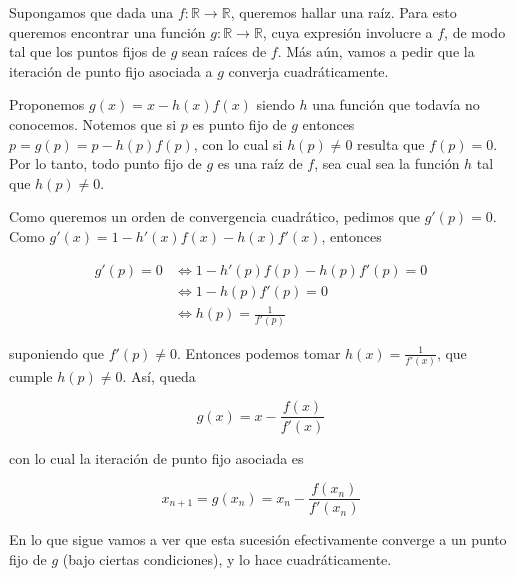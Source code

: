 Supongamos que dada una $f: \mathbb{R} \to \mathbb{R}$, queremos hallar una raíz. Para esto queremos encontrar una función $g: \mathbb{R} \to \mathbb{R}$, cuya expresión involucre a $f$, de modo tal que los puntos fijos de $g$ sean raíces de $f$. Más aún, vamos a pedir que la iteración de punto fijo asociada a $g$ converja cuadráticamente.

Proponemos $g(x) = x - h(x)f(x)$ siendo $h$ una función que todavía no conocemos. Notemos que si $p$ es punto fijo de $g$ entonces $p = g(p) = p - h(p)f(p)$, con lo cual si $h(p) \neq 0$ resulta que $f(p) = 0$. Por lo tanto, todo punto fijo de $g$ es una raíz de $f$, sea cual sea la función $h$ tal que $h(p) \neq 0$.

Como queremos un orden de convergencia cuadrático, pedimos que $g'(p) = 0$. Como $g'(x) = 1 - h'(x)f(x) - h(x) f'(x)$, entonces

\begin{align*}
g'(p) = 0 &\Leftrightarrow 1 - h'(p)f(p) - h(p)f'(p) = 0\\
&\Leftrightarrow 1 - h(p)f'(p) = 0\\
&\Leftrightarrow h(p) = \frac{1}{f'(p)}
\end{align*}

suponiendo que $f'(p) \neq 0$. Entonces podemos tomar $h(x) = \frac{1}{f'(x)}$, que cumple $h(p) \neq 0$. Así, queda

\[g(x) = x - \frac{f(x)}{f'(x)}\]

con lo cual la iteración de punto fijo asociada es

\[x_{n + 1} = g(x_n) = x_n - \frac{f(x_n)}{f'(x_n)}\]

En lo que sigue vamos a ver que esta sucesión efectivamente converge a un punto fijo de $g$ (bajo ciertas condiciones), y lo hace cuadráticamente.

